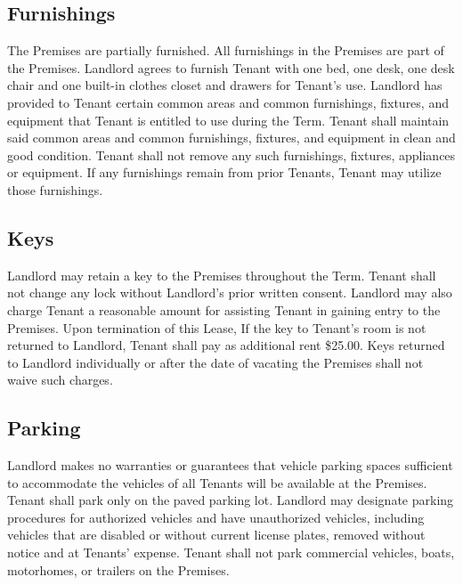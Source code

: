 \documentclass{article}
\begin{document}
\subsection{Furnishings}
The Premises are partially furnished. All furnishings in the Premises are part
of the Premises. Landlord agrees to furnish Tenant with one bed, one desk, one
desk chair and one built-in clothes closet and drawers for Tenant’s use.
Landlord has provided to Tenant certain common areas and common furnishings,
fixtures, and equipment that Tenant is entitled to use during the Term. Tenant
shall maintain said common areas and common furnishings, fixtures, and equipment
in clean and good condition. Tenant shall not remove any such furnishings,
fixtures, appliances or equipment. If any furnishings remain from prior Tenants,
Tenant may utilize those furnishings.

\subsection{Keys}
Landlord may retain a key to the Premises throughout the Term. Tenant shall not
change any lock without Landlord’s prior written consent. Landlord may also
charge Tenant a reasonable amount for assisting Tenant in gaining entry to the
Premises. Upon termination of this Lease,
%
%
%
If the
key to Tenant’s room is not returned to Landlord, Tenant shall pay as additional
rent \$25.00.
Keys returned to Landlord individually or after the date of
vacating the Premises shall not waive such charges.

\subsection{Parking}
%
Landlord makes no warranties
or guarantees that vehicle parking spaces sufficient to accommodate the vehicles
of all Tenants will be available at the Premises. Tenant shall park only on the
paved parking lot. Landlord may designate parking procedures for authorized
vehicles and have unauthorized vehicles, including vehicles that are disabled or
without current license plates, removed without notice and at Tenants’ expense.
Tenant shall not park commercial vehicles, boats, motorhomes, or trailers on the
Premises.
\end{document}
